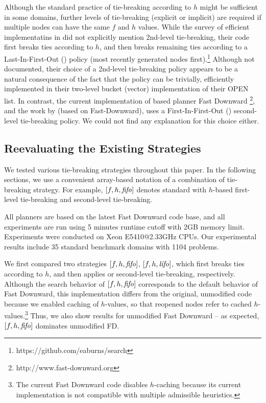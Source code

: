 Although the standard practice of tie-breaking according to $h$ might be
sufficient in some domains, further levels of tie-breaking (explicit or
implicit) are required if multiple nodes can have the same $f$ and
$h$ values.
While the survey of efficient \astar implementatins in \citeauthor{burns2012implementing} did not explicitly mention 2nd-level tie-breaking, their code first breaks ties according to $h$, and then breaks remaining ties according to a Last-In-First-Out (\lifo) policy (most recently generated nodes first).\footnote{https://github.com/eaburns/search}
Although not documented, their choice of a \lifo 2nd-level tie-breaking policy appears to be a natural consequence of the fact that the \lifo policy can be trivially, efficiently implemented in their two-level bucket (vector) implementation of their OPEN list.
In contrast, the current implementation of \sota \astar based planner Fast
Downward \cite{Helmert2006}\footnote{http://www.fast-downward.org}, and
the work by \cite{RogerH10} (based on Fast-Downward), uses
a First-In-First-Out (\fifo) second-level tie-breaking policy. We could
not find any explanation for this choice either.


\subsection{Reevaluating the Existing Strategies}


We tested various tie-breaking strategies throughout this paper.  In the
following sections, we use a convenient array-based notation of a
combination of tie-breaking strategy.  For example, $[f,h,\mbox{\textit{fifo}}]$ denotes
standard \astar with $h$-based first-level tie-breaking and \fifo
second-level tie-breaking.

All planners are based on the latest Fast Downward code base, and all
experiments are run using 5 minutes runtime cutoff with 2GB memory
limit. Experiments were conducted on Xeon E5410@2.33GHz CPUs.
Our experimental results include 35 standard benchmark domains with 1104
problems.

We first compared two strategies $[f,h,\mbox{\textit{fifo}}]$, $[f,h,\mbox{\textit{lifo}}]$, which
first breaks ties according to $h$, and then applies \fifo or \lifo
second-level tie-breaking, respectively.
Although the search behavior of $[f,h,\mbox{\textit{fifo}}]$ corresponds to the default behavior of Fast Downward, this implementation differs 
from the original, unmodified code because we enabled caching of $h$-values, so that reopened nodes refer to cached $h$-values.\footnote{The current Fast Downward code disables $h$-caching because its current implementation is not compatible with multiple admissible heuristics.}
Thus, we also show results for unmodified Fast Downward -- as expected, $[f,h,\mbox{\textit{fifo}}]$ dominates unmodified FD.

